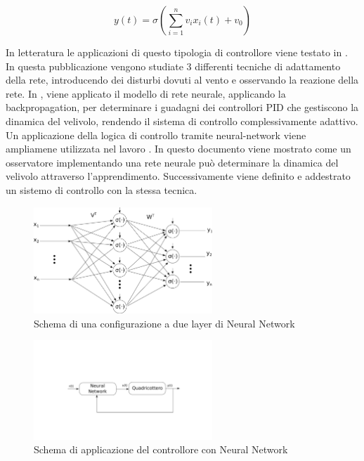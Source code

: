 \begin{equation}\label{eq:SistemaQuadrirotore_NN}
	y(t) = \sigma\left(\sum_{i=1}^{n} v_i x_i(t) + v_0\right)
\end{equation}

In letteratura le applicazioni di questo tipologia di controllore viene testato in \cite{4564736}. In questa pubblicazione vengono studiate 3 differenti tecniche di adattamento della rete, introducendo dei disturbi dovuti al vento e osservando la reazione della rete. In \cite{8287305}, viene applicato il modello di rete neurale, applicando la backpropagation, per determinare i guadagni dei controllori PID che gestiscono la dinamica del velivolo, rendendo il sistema di controllo complessivamente adattivo. Un applicazione della logica di controllo tramite neural-network viene ampliamene utilizzata nel lavoro \cite{5345702}. In questo documento viene mostrato come un osservatore implementando una rete neurale può determinare la dinamica del velivolo attraverso l'apprendimento. Successivamente viene definito e addestrato un sistemo di controllo con la stessa tecnica.

\begin{figure}
	\centering
	\includegraphics[width=0.6\textwidth]{SistemaQuadrirotore/Figure/NN_Struttura}
	\caption{Schema di una configurazione a due layer di Neural Network}
	\label{fig:NN}
\end{figure}

\begin{figure}
	\centering
	\includegraphics[width=0.6\textwidth]{SistemaQuadrirotore/Figure/NN}
	\caption{Schema di applicazione del controllore con Neural Network}
\end{figure}
